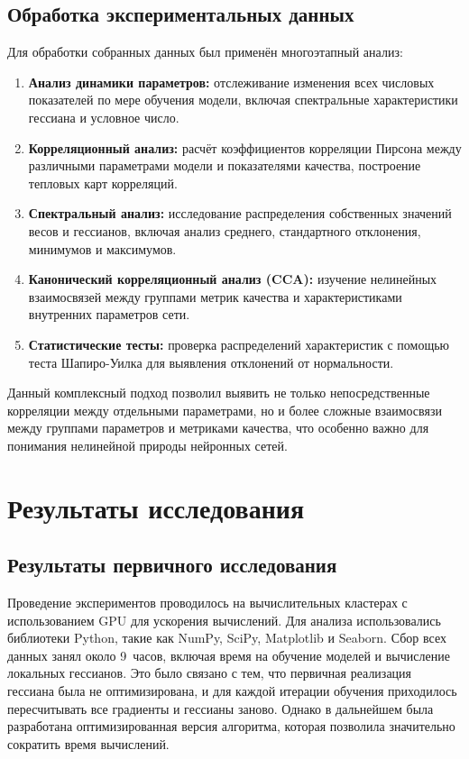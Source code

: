 \documentclass[a4paper,12pt]{article}
\begin{document}
\subsection{Обработка экспериментальных данных}

Для обработки собранных данных был применён многоэтапный анализ:

\begin{enumerate}
  \item \textbf{Анализ динамики параметров:} отслеживание изменения всех числовых показателей по мере
    обучения модели, включая спектральные характеристики гессиана и условное число.

  \item \textbf{Корреляционный анализ:} расчёт коэффициентов корреляции Пирсона между различными параметрами
    модели и показателями качества, построение тепловых карт корреляций.

  \item \textbf{Спектральный анализ:} исследование распределения собственных значений весов и гессианов,
    включая анализ среднего, стандартного отклонения, минимумов и максимумов.

  \item \textbf{Канонический корреляционный анализ (CCA):} изучение нелинейных взаимосвязей между группами
    метрик качества и характеристиками внутренних параметров сети.

  \item \textbf{Статистические тесты:} проверка распределений характеристик с помощью теста Шапиро-Уилка
    \cite{shapiro1965} для выявления отклонений от нормальности.
\end{enumerate}

Данный комплексный подход позволил выявить не только непосредственные корреляции между отдельными
параметрами, но и более сложные взаимосвязи между группами параметров и метриками качества, что особенно
важно для понимания нелинейной природы нейронных сетей.

\section{Результаты исследования}

\subsection*{Результаты первичного исследования}

Проведение экспериментов проводилось на вычислительных кластерах с использованием GPU для ускорения
вычислений. Для анализа использовались библиотеки Python, такие как NumPy, SciPy, Matplotlib и Seaborn.
Сбор всех данных занял около 9~часов, включая время на обучение моделей и вычисление локальных гессианов. Это
было связано с тем, что первичная реализация гессиана была не оптимизирована, и для каждой итерации обучения
приходилось пересчитывать все градиенты и гессианы заново. Однако в дальнейшем была разработана
оптимизированная версия алгоритма, которая позволила значительно сократить время вычислений.
\end{document}
